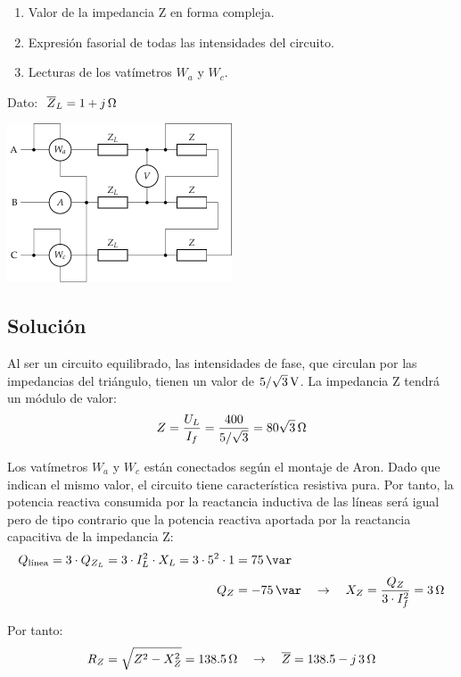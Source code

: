 \begin{enumerate}
\item Valor de la impedancia Z en forma compleja.
\item Expresión fasorial de todas las intensidades del circuito.
\item Lecturas de los vatímetros $W_a$ y $W_c$.
\end{enumerate}

Dato: $\; \overline{Z}_L = \SI[parse-numbers = false]{1 + j}{\ohm}$

\begin{center}
  \includegraphics[width = 0.5\textwidth]{figuras/BT3_12}
\end{center}


\subsection*{Solución}

Al ser un circuito equilibrado, las intensidades de fase, que
circulan por las impedancias del triángulo, tienen un valor de
$\SI[parse-numbers=false]{5/\sqrt{3}}{\volt}$. La impedancia Z
tendrá un módulo de valor:
\[
  Z = \frac{U_L}{I_f} = \frac{400}{5/\sqrt{3}} =
  \SI[parse-numbers=false]{80\sqrt{3}}{\ohm}
\]

Los vatímetros $W_a$ y $W_c$ están conectados según el montaje de Aron. Dado que indican el mismo valor, el
circuito tiene característica resistiva pura. Por tanto, la
potencia reactiva consumida por la reactancia inductiva de las
líneas será igual pero de tipo contrario que la potencia reactiva
aportada por la reactancia capacitiva de la impedancia Z:
\begin{align*}
  Q_{\textrm{línea}} = 3 \cdot Q_{Z_L} = 3 \cdot I_L^2 \cdot X_L = 3 \cdot 5^2 \cdot 1 &= \SI{75}{\var}\\[3pt]
  Q_Z &= -\SI{75}{\var} \quad\rightarrow\quad
  X_Z = \dfrac{Q_Z}{3\cdot I_f^2} = \SI{3}{\ohm}
\end{align*}

Por tanto:
\[
  R_Z = \sqrt{Z^2 - X_Z^2} = \SI{138.5}{\ohm} \quad\rightarrow\quad \overline{Z} = \SI[parse-numbers=false]{138.5 - j\,3}{\ohm}
\]

